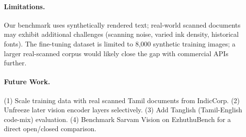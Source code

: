 \documentclass[11pt,a4paper]{article}
\begin{document}
\paragraph{Limitations.}
Our benchmark uses synthetically rendered text; real-world scanned documents
may exhibit additional challenges (scanning noise, varied ink density,
historical fonts).
The fine-tuning dataset is limited to 8,000 synthetic training images; a
larger real-scanned corpus would likely close the gap with commercial APIs
further.

\paragraph{Future Work.}
(1) Scale training data with real scanned Tamil documents from IndicCorp.
(2) Unfreeze later vision encoder layers selectively.
(3) Add Tanglish (Tamil-English code-mix) evaluation.
(4) Benchmark Sarvam Vision on EzhuthuBench for a direct open/closed comparison.



\end{document}
